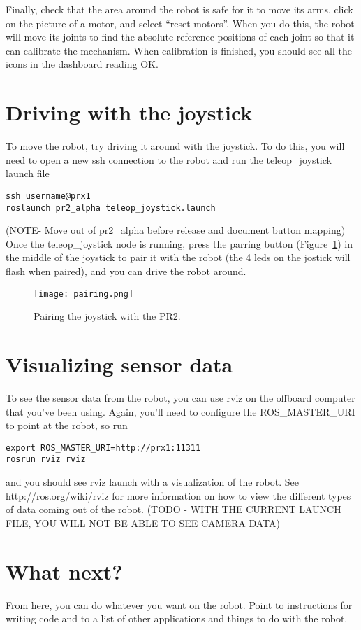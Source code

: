 Finally, check that the area around the robot is safe for it to move its arms, click on the picture of a motor, and select ``reset motors''.  When you do this, the robot will move its joints to find the absolute reference positions of each joint so that it can calibrate the mechanism.  When calibration is finished, you should see all the icons in the dashboard reading OK.
\section{Driving with the joystick}
To move the robot, try driving it around with the joystick.  To do this, you will need to open a new ssh connection to the robot and run the teleop\_joystick launch file
\begin{verbatim}
ssh username@prx1
roslaunch pr2_alpha teleop_joystick.launch 
\end{verbatim}
(NOTE- Move out of pr2\_alpha before release and document button mapping)
Once the teleop\_joystick node is running, press the parring button (Figure~\ref{fig:pairing}) in the middle of the joystick to pair it with the robot (the 4 leds on the jostick will flash when paired), and you can drive the robot around.
\begin{figure}[H]
\centering
\texttt{[image: pairing.png]}
\caption{Pairing the joystick with the PR2.}
\label{fig:pairing}
\end{figure}


\section{Visualizing sensor data}
To see the sensor data from the robot, you can use rviz on the offboard computer that you've been using.  Again, you'll need to configure the ROS\_MASTER\_URI to point at the robot, so run
\begin{verbatim}
export ROS_MASTER_URI=http://prx1:11311
rosrun rviz rviz
\end{verbatim}
and you should see rviz launch with a visualization of the robot.  See http://ros.org/wiki/rviz for more information on how to view the different types of data coming out of the robot.
(TODO - WITH THE CURRENT LAUNCH FILE, YOU WILL NOT BE ABLE TO SEE CAMERA DATA)

\section{What next?}
From here, you can do whatever you want on the robot.  Point to instructions for writing code and to a list of other applications and things to do with the robot.
